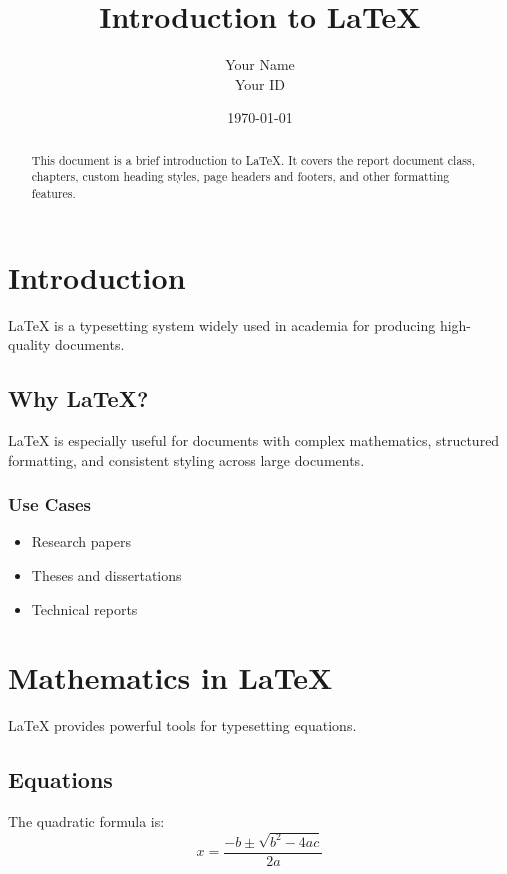 ﻿\documentclass[12pt, a4paper]{report}
\title{{\Huge \textbf{Introduction to LaTeX}}}
\author{{\Large Your Name} \\ Your ID}
\date{\today}
\begin{document}
\maketitle
\thispagestyle{empty}

\begin{abstract}
This document is a brief introduction to \LaTeX{}. It covers the report document class,
chapters, custom heading styles, page headers and footers, and other formatting features.
\end{abstract}

\tableofcontents

\chapter{Introduction}
\LaTeX{} is a typesetting system widely used in academia for producing high-quality documents.

\section{Why LaTeX?}
\LaTeX{} is especially useful for documents with complex mathematics, structured formatting,
and consistent styling across large documents.

\subsection{Use Cases}
\begin{itemize}
    \item Research papers
    \item Theses and dissertations
    \item Technical reports
\end{itemize}

\chapter{Mathematics in LaTeX}
\LaTeX{} provides powerful tools for typesetting equations.

\section{Equations}
The quadratic formula is:
\begin{equation}
    x = \frac{-b \pm \sqrt{b^2 - 4ac}}{2a}
\end{equation}
\end{document}
